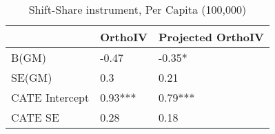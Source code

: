 \begin{table}\centering\caption{Shift-Share instrument, Per Capita (100,000)}\begin{tabular}{lll}
\toprule
                & OrthoIV   & Projected OrthoIV   \\
\midrule
 B(GM)          & -0.47     & -0.35*              \\
 SE(GM)         & 0.3       & 0.21                \\
 CATE Intercept & 0.93***   & 0.79***             \\
 CATE SE        & 0.28      & 0.18                \\
\bottomrule
\end{tabular}\end{table}